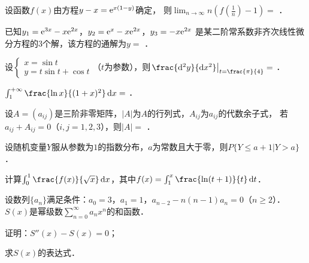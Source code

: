 \documentclass[plain,noanswer,medmath]{../../template/jnuexam}
\begin{document}


\begin{problem}
设函数$f(x)$由方程$y - x = \mathrm{e}^{x(1 - y)}$确定，
则$\lim_{n \to \infty} n\left(f\left(\frac{1}{n} \right) - 1 \right) =$ \fillin{}．
\end{problem}


\begin{problem}
已知$y_1 = \mathrm{e}^{3x} - x\mathrm{e}^{2x}$，$y_2 = \mathrm{e}^x - x\mathrm{e}^{2x}$，$y_3 = - x\mathrm{e}^{2x}$
是某二阶常系数非齐次线性微分方程的$3$个解，该方程的通解为$y =$ \fillin{}．
\end{problem}


\begin{problem}
设$\begin{cases}
  x = \sin t \\
  y = t\sin t + \cos t
\end{cases}$（$t$为参数），则$\left. \frac{\d^2y}{\dx^2} \right|_{t = \frac{\pi}{4}} =$ \fillin{}．
\end{problem}


\begin{problem}
$\int_1^{+\infty} \frac{\ln x}{(1 + x)^2}\dx =$ \fillin{}．
\end{problem}


\begin{problem}
设$A = (a_{ij})$是三阶非零矩阵，$|A|$为$A$的行列式，$A_{ij}$为$a_{ij}$的代数余子式，
若$a_{ij} + A_{ij} = 0$（$i,j = 1,2,3$），则$|A| =$ \fillin{}．
\end{problem}


\begin{problem}
设随机变量$Y$服从参数为$1$的指数分布，$a$为常数且大于零，\goodbreak 则$P\{Y \le a + 1|Y > a\}$ \fillin{}．
\end{problem}




\begin{problem}[points=10]
计算$\int_0^1\frac{f(x)}{\sqrt{x}}\dx$，其中$f(x) = \int_1^x \frac{\ln(t + 1)}{t}\dt$．
\end{problem}


\begin{problem}[points=10]
设数列$\{a_n\}$满足条件：$a_0 = 3$，$a_1 = 1$，$a_{n - 2} - n(n - 1)a_n = 0$（$n \ge 2$）．
$S(x)$是幂级数$\sum_{n = 0}^{\infty}a_n x^n$的和函数．\par
\begin{enumerate*}
\item 证明：$S''(x) - S(x) = 0$；
\item 求$S(x)$的表达式．
\end{enumerate*}
\end{problem}
\end{document}
